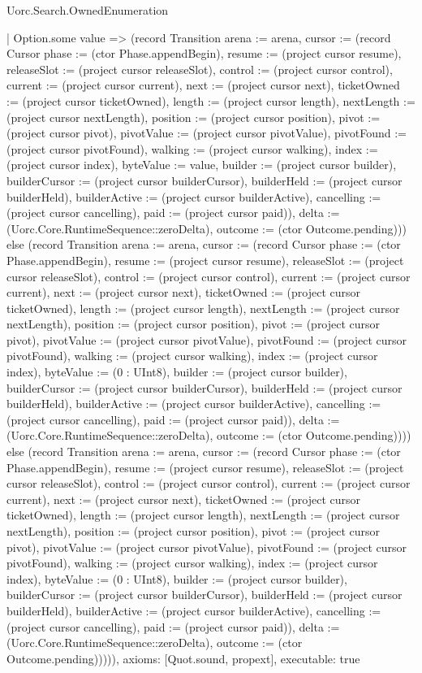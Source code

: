 \begin{lexlean}{Uorc.Search.OwnedEnumeration}
\begin{semanticmodule}
{    | Option.some value => (record Transition {arena := arena, cursor := (record Cursor {phase := (ctor Phase.appendBegin), resume := (project cursor resume), releaseSlot := (project cursor releaseSlot), control := (project cursor control), current := (project cursor current), next := (project cursor next), ticketOwned := (project cursor ticketOwned), length := (project cursor length), nextLength := (project cursor nextLength), position := (project cursor position), pivot := (project cursor pivot), pivotValue := (project cursor pivotValue), pivotFound := (project cursor pivotFound), walking := (project cursor walking), index := (project cursor index), byteValue := value, builder := (project cursor builder), builderCursor := (project cursor builderCursor), builderHeld := (project cursor builderHeld), builderActive := (project cursor builderActive), cancelling := (project cursor cancelling), paid := (project cursor paid)}), delta := (Uorc.Core.RuntimeSequence::zeroDelta), outcome := (ctor Outcome.pending)})) else (record Transition {arena := arena, cursor := (record Cursor {phase := (ctor Phase.appendBegin), resume := (project cursor resume), releaseSlot := (project cursor releaseSlot), control := (project cursor control), current := (project cursor current), next := (project cursor next), ticketOwned := (project cursor ticketOwned), length := (project cursor length), nextLength := (project cursor nextLength), position := (project cursor position), pivot := (project cursor pivot), pivotValue := (project cursor pivotValue), pivotFound := (project cursor pivotFound), walking := (project cursor walking), index := (project cursor index), byteValue := (0 : UInt8), builder := (project cursor builder), builderCursor := (project cursor builderCursor), builderHeld := (project cursor builderHeld), builderActive := (project cursor builderActive), cancelling := (project cursor cancelling), paid := (project cursor paid)}), delta := (Uorc.Core.RuntimeSequence::zeroDelta), outcome := (ctor Outcome.pending)}))) else (record Transition {arena := arena, cursor := (record Cursor {phase := (ctor Phase.appendBegin), resume := (project cursor resume), releaseSlot := (project cursor releaseSlot), control := (project cursor control), current := (project cursor current), next := (project cursor next), ticketOwned := (project cursor ticketOwned), length := (project cursor length), nextLength := (project cursor nextLength), position := (project cursor position), pivot := (project cursor pivot), pivotValue := (project cursor pivotValue), pivotFound := (project cursor pivotFound), walking := (project cursor walking), index := (project cursor index), byteValue := (0 : UInt8), builder := (project cursor builder), builderCursor := (project cursor builderCursor), builderHeld := (project cursor builderHeld), builderActive := (project cursor builderActive), cancelling := (project cursor cancelling), paid := (project cursor paid)}), delta := (Uorc.Core.RuntimeSequence::zeroDelta), outcome := (ctor Outcome.pending)})))),
  axioms: [Quot.sound, propext],
  executable: true
}


\end{semanticmodule}
\end{lexlean}
